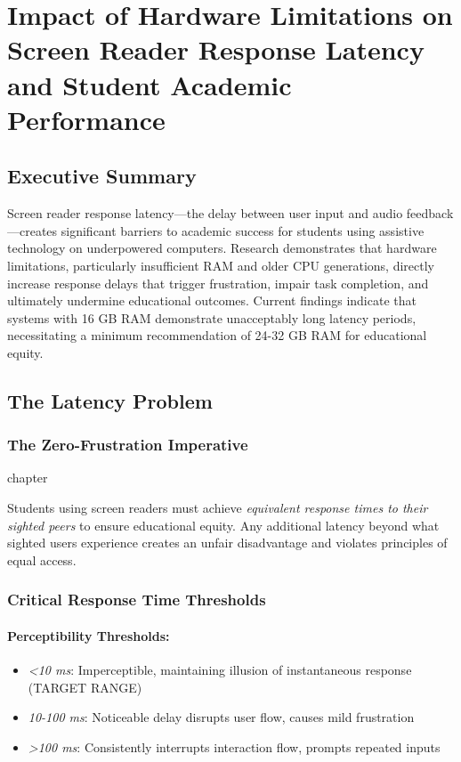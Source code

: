 \chapter{Impact of Hardware Limitations on Screen Reader Response Latency and Student Academic Performance}\label{vision-assistive-technology-laptop-computer-requirements}

\section{Executive Summary}\label{executive-summary}

Screen reader response latency—the delay between user input and audio feedback—creates significant barriers to academic success for students using assistive technology on underpowered computers. Research demonstrates that hardware limitations, particularly insufficient RAM and older CPU generations, directly increase response delays that trigger frustration, impair task completion, and ultimately undermine educational outcomes. Current findings indicate that systems with 16 GB RAM demonstrate unacceptably long latency periods, necessitating a minimum recommendation of 24-32 GB RAM for educational equity.

\section{The Latency Problem}\label{the-latency-problem}

\subsection{The Zero-Frustration Imperative}chapter\label{the-zero-frustration-imperative}

Students using screen readers must achieve \emph{equivalent response times to their sighted peers} to ensure educational equity. Any additional latency beyond what sighted users experience creates an unfair disadvantage and violates principles of equal access.

\subsection{Critical Response Time Thresholds}\label{critical-response-time-thresholds}

\subsubsection{Perceptibility Thresholds:}
\begin{itemize}
    \item \emph{<10 ms}: Imperceptible, maintaining illusion of instantaneous response (TARGET RANGE)
    \item \emph{10-100 ms}: Noticeable delay disrupts user flow, causes mild frustration
    \item \emph{>100 ms}: Consistently interrupts interaction flow, prompts repeated inputs
\end{itemize}

